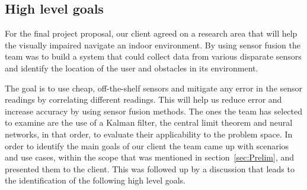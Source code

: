 \documentclass[prodmode,acmtosem]{acmsmall} %
\begin{document}

\subsection{High level goals}

For the final project proposal, our client agreed on a research area that will help the visually impaired navigate an indoor environment.
By using sensor fusion the team was to build a system that could collect data from various disparate sensors and identify the location of the user and obstacles in its environment.

The goal is to use cheap, off-the-shelf sensors and mitigate any error in the sensor readings by correlating different readings. This will help us reduce error and increase accuracy by using sensor fusion methods. The ones the team has selected to examine are the use of a Kalman filter, the central limit theorem and neural networks, in that order, to evaluate their applicability to the problem space. In order to identify the main goals of our client the team came up with scenarios and use cases, within the scope that was mentioned in section~\ref{sec:Prelim}, and presented them to the client. This was followed up by a discussion that leads to the identification of the following high level goals.
\end{document}
